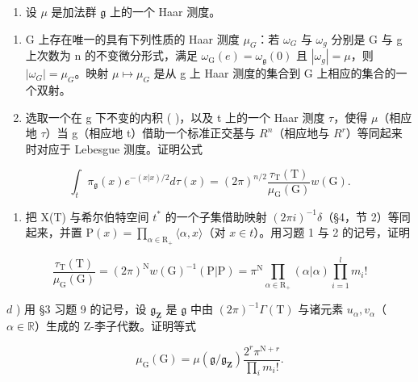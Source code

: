 \begin{enumerate}
\begin{enumerate}
\def\labelenumi{\arabic{enumi})}
\setcounter{enumi}{2}
\tightlist
\item
  设 \(\mu\) 是加法群 \(\mathfrak{g}\) 上的一个 Haar 测度。
\end{enumerate}

\begin{enumerate}
\def\labelenumi{\alph{enumi})}
\item
  G 上存在唯一的具有下列性质的 Haar 测度 \(\mu_{G}\)：若 \(\omega_{G}\) 与 \(\omega_{g}\) 分别是 G 与 g 上次数为 n 的不变微分形式，满足 \(\omega_{\mathrm{G}}(e)=\omega_{\mathfrak{g}}(0)\) 且 \(|\omega_{g}|=\mu\)，则 \(|\omega_{G}|=\mu_{G}\)。映射 \(\mu\mapsto\mu_{G}\) 是从 g 上 Haar 测度的集合到 G 上相应的集合的一个双射。
\item
  选取一个在 g 下不变的内积 ( \textbar{} )，以及 t 上的一个 Haar 测度 \(\tau\)，使得 \(\mu\)（相应地 \(\tau\)）当 g（相应地 t）借助一个标准正交基与 \(R^{n}\)（相应地与 \(R^{r}\)）等同起来时对应于 Lebesgue 测度。证明公式
\end{enumerate}

\[
\int_ {t} \pi_ {\mathfrak {g}} (x) e ^ {- (x | x) / 2} d \tau (x) = (2 \pi) ^ {n / 2} \frac {\tau_ {\mathrm{T}} (\mathrm{T})}{\mu_ {\mathrm{G}} (\mathrm{G})} w (\mathrm{G}).
\]

\begin{enumerate}
\def\labelenumi{\alph{enumi})}
\setcounter{enumi}{2}
\tightlist
\item
  把 X(T) 与希尔伯特空间 \(t^{*}\) 的一个子集借助映射 \((2\pi i)^{-1}\delta\)（§4，节 2）等同起来，并置 \(\mathrm{P}(x)=\prod_{\alpha\in\mathrm{R}_{+}}\langle\alpha,x\rangle\)（对 \(x\in t\)）。用习题 1 与 2 的记号，证明
\end{enumerate}

\[
\frac {\tau_ {\mathrm{T}} (\mathrm{T})}{\mu_ {\mathrm{G}} (\mathrm{G})} = (2 \pi) ^ {\mathrm{N}} w (\mathrm{G}) ^ {- 1} (\mathrm{P} | \mathrm{P}) = \pi^ {\mathrm{N}} \prod_ {\alpha \in \mathrm{R} _ {+}} (\alpha | \alpha) \prod_ {i = 1} ^ {l} m _ {i}!
\]

\(d\) ) 用 §3 习题 9 的记号，设 \(\mathfrak{g}_{\mathbf{Z}}\) 是 \(\mathfrak{g}\) 中由 \((2\pi)^{-1}\Gamma (\mathrm{T})\) 与诸元素 \(u_{\alpha},v_{\alpha}\)（\(\alpha \in \mathbb{R}\)）生成的 Z-李子代数。证明等式

\[
\mu_ {\mathrm{G}} (\mathrm{G}) = \mu (\mathfrak {g} / \mathfrak {g} _ {\mathbf {Z}}) \frac {2 ^ {r} \pi^ {\mathrm{N} + r}}{\prod_ {i} m _ {i} !}.
\]


\end{enumerate}
